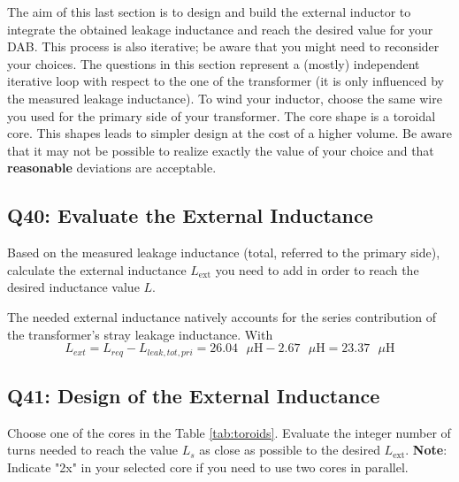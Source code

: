 \documentclass{PELsmallreport}
\begin{document}
The aim of this last section is to design and build the external inductor to integrate the obtained leakage inductance and reach the desired value for your DAB. 
This process is also iterative; be aware that you might need to reconsider your choices. 
The questions in this section represent a (mostly) independent iterative loop with respect to the one of the transformer (it is only influenced by the measured leakage inductance).  
To wind your inductor, choose the same wire you used for the primary side of your transformer. 
The core shape is a toroidal core. 
This shapes leads to simpler design at the cost of a higher volume.   
Be aware that it may not be possible to realize exactly the value of your choice and that \textbf{reasonable} deviations are acceptable.






\subsection{Q40: Evaluate the External Inductance} 
Based on the measured leakage inductance (total, referred to the primary side), calculate the external inductance $L_\mathrm{ext}$ you need to add in order to reach the desired inductance value $L$. 
\\

\begin{framed}
	\vspace{2em}
The needed external inductance natively accounts for the series contribution of the transformer's stray leakage inductance. With \[ L_{ext} = L_{req} - L_{leak,tot,pri} = 26.04\text{ }\mu\text{H} - 2.67\text{ }\mu\text{H} = 23.37\text{ }\mu\text{H} \]


	\vspace{2em}
\end{framed}

 \hfill{}









\subsection{Q41: Design of the External Inductance} 
Choose one of the cores in the Table \ref{tab:toroids}. 
Evaluate the integer number of turns needed to reach the value $L_s$ as close as possible to the desired $L_\mathrm{ext}$.
\textbf{Note}: Indicate "2x" in your selected core if you need to use two cores in parallel.  
\\
\end{document}
